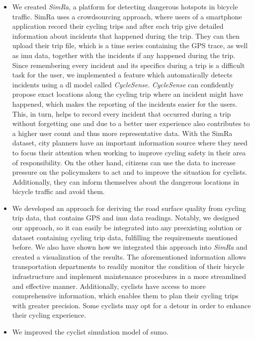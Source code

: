 \begin{itemize}
\item We created \textit{SimRa}, a platform for detecting dangerous hotspots in bicycle traffic.
SimRa uses a crowdsourcing approach, where users of a smartphone application record their cycling trips and after each trip give detailed information about incidents that happened during the trip.
They can then upload their trip file, which is a time series containing the GPS trace, as well as \ac{imu} data, together with the incidents if any happened during the trip.
Since remembering every incident and its specifics during a trip is a difficult task for the user, we implemented a feature which automatically detects incidents using a \ac{dl} model called \textit{CycleSense}.
\textit{CycleSense} can confidently propose exact locations along the cycling trip where an incident might have happened, which makes the reporting of the incidents easier for the users.
This, in turn, helps to record every incident that occurred during a trip without forgetting one and due to a better user experience also contributes to a higher user count and thus more representative data. 
With the SimRa dataset, city planners have an important information source where they need to focus their attention when working to improve cycling safety in their area of responsibility.
On the other hand, citizens can use the data to increase pressure on the policymakers to act and to improve the situation for cyclists.
Additionally, they can inform themselves about the dangerous locations in bicycle traffic and avoid them.
\item We developed an approach for deriving the road surface quality from cycling trip data, that contains GPS and \ac{imu} data readings.
Notably, we designed our approach, so it can easily be integrated into any preexisting solution or dataset containing cycling trip data, fulfilling the requirements mentioned before.
We also have shown how we integrated this approach into \textit{SimRa} and created a visualization of the results.
The aforementioned information allows transportation departments to readily monitor the condition of their bicycle infrastructure and implement maintenance procedures in a more streamlined and effective manner.
Additionally, cyclists have access to more comprehensive information, which enables them to plan their cycling trips with greater precision.
Some cyclists may opt for a detour in order to enhance their cycling experience.
\item We improved the cyclist simulation model of \ac{sumo}.

\end{itemize}
